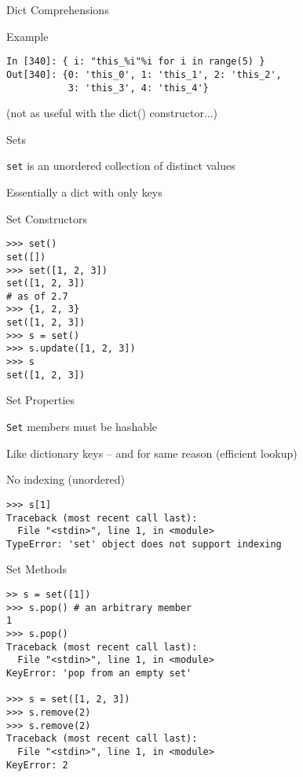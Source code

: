 \documentclass{beamer}
\begin{document}
\begin{frame}[fragile]{Dict Comprehensions}

{\Large Example}

\begin{verbatim}
In [340]: { i: "this_%i"%i for i in range(5) }
Out[340]: {0: 'this_0', 1: 'this_1', 2: 'this_2',
           3: 'this_3', 4: 'this_4'}
\end{verbatim}

\vfill
(not as useful with the dict() constructor...)
\end{frame} 


\begin{frame}[fragile]{ Sets }

\vfill
{\Large \verb|set| is an unordered collection of distinct values}

\vfill
{\Large Essentially a dict with only keys}

\vfill

\end{frame} 

\begin{frame}[fragile]{Set Constructors}

\vfill
\begin{verbatim}
>>> set()
set([])
>>> set([1, 2, 3])
set([1, 2, 3])
# as of 2.7
>>> {1, 2, 3}
set([1, 2, 3])
>>> s = set()
>>> s.update([1, 2, 3])
>>> s
set([1, 2, 3])
\end{verbatim}
\vfill

\end{frame}

\begin{frame}[fragile]{ Set Properties}

\vfill
{\Large \verb|Set| members must be hashable}

\vfill
{\Large Like dictionary keys -- and for same reason (efficient lookup)}

\vfill
{\Large No indexing (unordered) }

\vfill
\begin{verbatim}
>>> s[1]
Traceback (most recent call last):
  File "<stdin>", line 1, in <module>
TypeError: 'set' object does not support indexing
\end{verbatim}

\vfill
\end{frame} 

\begin{frame}[fragile]{ Set Methods}

\begin{verbatim}
>> s = set([1])
>>> s.pop() # an arbitrary member
1
>>> s.pop()
Traceback (most recent call last):
  File "<stdin>", line 1, in <module>
KeyError: 'pop from an empty set'

>>> s = set([1, 2, 3])
>>> s.remove(2)
>>> s.remove(2)
Traceback (most recent call last):
  File "<stdin>", line 1, in <module>
KeyError: 2
\end{verbatim}

\vfill
\end{frame} 
\end{document}
